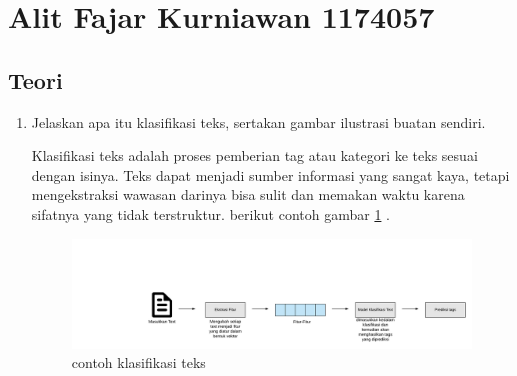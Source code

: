 \section{Alit Fajar Kurniawan 1174057}

\subsection{Teori}
\begin{enumerate}
\item Jelaskan apa itu klasifikasi teks, sertakan gambar ilustrasi buatan sendiri.
\par Klasiﬁkasi teks adalah proses pemberian tag atau kategori ke teks sesuai dengan isinya. Teks dapat menjadi sumber informasi yang sangat kaya, tetapi mengekstraksi wawasan darinya bisa sulit dan memakan waktu karena sifatnya yang tidak terstruktur. berikut contoh gambar \ref{klasifikasi teks} .
\begin{figure}[H]
\centering
\includegraphics[scale=0.2]{figures/1174057/chapter4/1.png}
\caption{contoh klasifikasi teks}
\label{klasifikasi teks}
\end{figure}


\end{enumerate}

